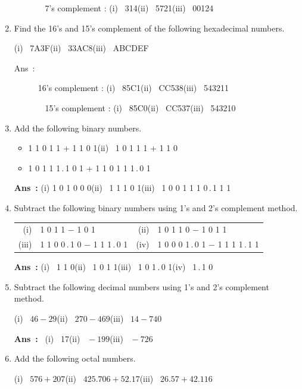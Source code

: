 \begin{enumerate}
\begin{description}
~ 7's complement : (i)~ 314\qquad (ii)~ 5721\qquad (iii)~ 00124
\end{description}

\item Find the 16's and 15's complement of the following hexadecimal numbers.

\smallskip
(i)~ 7A3F\qquad (ii)~ 33AC8\qquad (iii)~ ABCDEF
\begin{description}
\item[Ans~:] 16's complement : (i)~ 85C1\qquad (ii)~ CC538\qquad (iii)~ 543211

~ 15's complement : (i)~ 85C0\qquad (ii)~ CC537\qquad (iii)~ 543210
\end{description}

\item Add the following binary numbers.
\begin{itemize}
\item[(i)] 1 1 0 1 1 + 1 1 0 1\qquad (ii)~ 1 0 1 1 1 + 1 1 0\qquad 

\item[(iii)] 1 0 1 1 1\,.\,1 0 1 + 1 1 0 1 1 1\,.\,0 1
\end{itemize}

{\bf Ans~:} (i) 1 0 1 0 0 0\qquad (ii)~ 1 1 1 0 1\qquad (iii)~ 1 0 0 1 1 1 0\,.\,1 1 1

\item Subtract the following binary numbers using 1's and 2's complement method.

\smallskip
\begin{tabular}{r@{\;}l@{\qquad\quad}r@{\;}l}
(i) & 1 0 1 1 $-$ 1 0 1 & (ii) & 1 0 1 1 0 $-$ 1 0 1 1\\[4pt]
(iii) & 1 1 0 0\,.\,1 0 $-$ 1 1 1\,.\,0 1 & (iv) & 1 0 0 0 1\,.\,0 1 $-$ 1 1 1 1\,.\,1 1
\end{tabular}

\smallskip
{\bf Ans~:} (i)~ 1 1 0\qquad (ii)~ 1 0 1 1\qquad (iii)~ 1 0 1\,.\,0 1\qquad (iv)~ 1\,.\,1 0

\item Subtract the following decimal numbers using 1's and 2's complement method.

\smallskip
(i)~ $46-29$\qquad (ii)~ $270-469$\qquad (iii)~ $14-740$

\smallskip
{\bf Ans~:}~ (i)~ 17\qquad (ii)~ ${}-199$\qquad (iii)~ ${}-726$

\item Add the following octal numbers.

\smallskip
(i)~ $576+207$\qquad (ii)~ $425.706+52.17$\qquad (iii)~ $26.57+42.116$


\end{enumerate}
